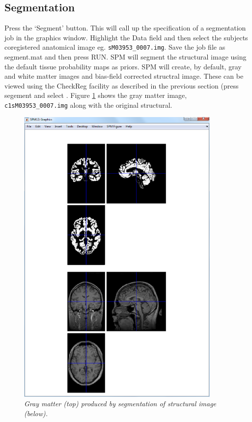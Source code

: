 \documentclass[a4paper,titlepage]{book}
\begin{document}
\subsection{Segmentation}

Press the `Segment' button. This will call up the specification of a segmentation job in the graphics 
window. Highlight the Data field and then select 
the subjects coregistered anatomical image 
eg. \verb!sM03953_0007.img!. Save the job file
as {\sf segment.mat} and then press RUN.
SPM will segment the structural image using 
the default tissue probability maps as 
priors. 
SPM will create, by default, gray and white matter
images and bias-field corrected structral image.
These can be viewed using the CheckReg facility 
as described in the previous section (press segement 
and select . Figure \ref{face_gray} shows the gray matter image, \verb!c1sM03953_0007.img! along with the original structural.
\begin{figure}
\begin{center}
\includegraphics[width=100mm]{gray}
\caption{\em Gray matter (top) produced by segmentation of structural image (below). \label{face_gray}}
\end{center}
\end{figure}
\end{document}
